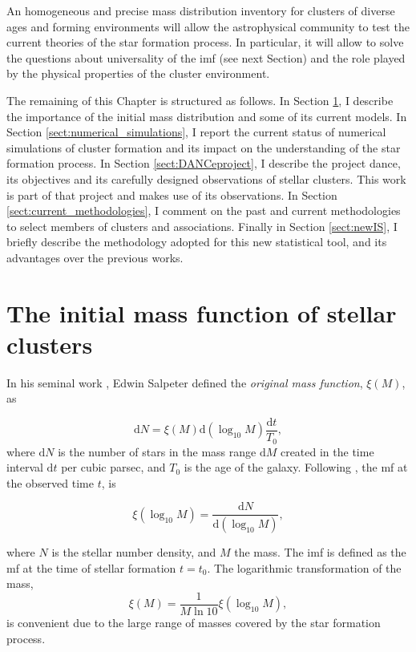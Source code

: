 An homogeneous and precise mass distribution inventory for clusters of diverse ages and forming environments will allow the astrophysical community to test the current theories of the star formation process. In particular, it will allow to solve the questions about universality of the \gls{imf} (see next Section) and the role played by the physical properties of the cluster environment.    

The remaining of this Chapter is structured as follows. In Section \ref{sect:IMF}, I describe the importance of the initial mass distribution and some of its current models. In Section \ref{sect:numerical_simulations}, I report the current status of numerical simulations of cluster formation and its impact on the understanding of the star formation process. In Section \ref{sect:DANCeproject}, I describe the project \gls{dance}, its objectives and its carefully designed observations of stellar clusters. This work is part of that project and makes use of its observations. In Section \ref{sect:current_methodologies}, I comment on the past and current methodologies to select members of clusters and associations. Finally in Section \ref{sect:newIS}, I briefly describe the methodology adopted for this new statistical tool, and its advantages over the previous works. 

\section{The initial mass function of stellar clusters}
\label{sect:IMF}

In his seminal work \citep{Salpeter1955}, Edwin Salpeter defined the \emph{original mass function}, $\xi(M)$, as

\begin{equation}
\mathrm{d}N= \xi(M)\mathrm{d}(\log_{10} M) \frac{\mathrm{d}t}{T_0},\nonumber
\end{equation}
where $\mathrm{d}N$ is the number of stars in the mass range $\mathrm{d}M$ created in the time interval $\mathrm{d}t$ per cubic parsec, and $T_0$ is the age of the galaxy. Following \citet{Chabrier2003b},  the \gls{mf} at the observed time $t$, is

\begin{equation}
\xi(\log_{10} M)=\frac{\mathrm{d}N}{\mathrm{d}(\log_{10} M)},\nonumber
\end{equation}

where $N$ is the stellar number density, and $M$ the mass. The \gls{imf} is defined as the \gls{mf} at the time of stellar formation $t=t_0$. The logarithmic transformation of the mass,
\begin{equation}
\xi(M)=\frac{1}{M \ln 10} \xi (\log_{10} M),\nonumber
\end{equation}
is convenient due to the large range of masses covered by the star formation process.

